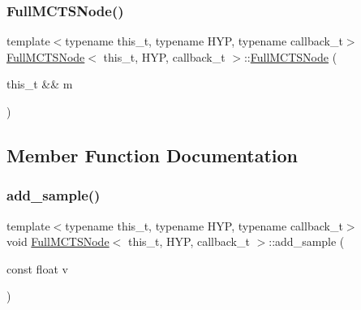 \subsubsection{\texorpdfstring{Full\+M\+C\+T\+S\+Node()}{FullMCTSNode()}\hspace{0.1cm}{\footnotesize\ttfamily [5/5]}}
{\footnotesize\ttfamily template$<$typename this\+\_\+t, typename H\+YP, typename callback\+\_\+t$>$ \\
\hyperlink{class_full_m_c_t_s_node}{Full\+M\+C\+T\+S\+Node}$<$ this\+\_\+t, H\+YP, callback\+\_\+t $>$\+::\hyperlink{class_full_m_c_t_s_node}{Full\+M\+C\+T\+S\+Node} (\begin{DoxyParamCaption}\item[{this\+\_\+t \&\&}]{m }\end{DoxyParamCaption})\hspace{0.3cm}{\ttfamily [inline]}}



\subsection{Member Function Documentation}
\mbox{\label{class_full_m_c_t_s_node_a9c160f6b2732178bf7c2e32c125f4724}} 
\subsubsection{\texorpdfstring{add\+\_\+sample()}{add\_sample()}}
{\footnotesize\ttfamily template$<$typename this\+\_\+t, typename H\+YP, typename callback\+\_\+t$>$ \\
void \hyperlink{class_full_m_c_t_s_node}{Full\+M\+C\+T\+S\+Node}$<$ this\+\_\+t, H\+YP, callback\+\_\+t $>$\+::add\+\_\+sample (\begin{DoxyParamCaption}\item[{const float}]{v }\end{DoxyParamCaption})\hspace{0.3cm}{\ttfamily [inline]}}

\mbox{\label{class_full_m_c_t_s_node_aea09f6d9b8a5adfe97c81f698b718560}} 
